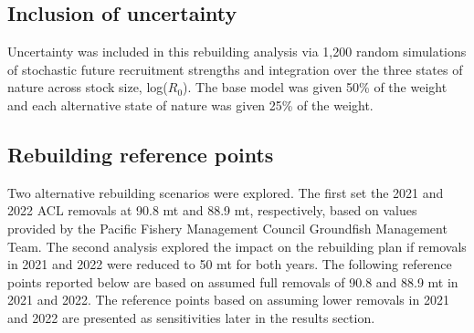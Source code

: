 \documentclass[11pt,
  english,
  a4paper,
]{article}
\begin{document}
\hypertarget{inclusion-of-uncertainty}{%
\subsection{Inclusion of uncertainty}\label{inclusion-of-uncertainty}}

\leavevmode\tagmcend\tagstructend


Uncertainty was included in this rebuilding analysis via 1,200 random simulations of stochastic future recruitment strengths and integration over the three states of nature across stock size, log({\(R_0\)\leavevmode\tagmcend\tagstructend}). The base model was given 50\% of the weight and each alternative state of nature was given 25\% of the weight.

\leavevmode\tagmcend\tagstructend\par


\hypertarget{rebuilding-reference-points}{%
\subsection{Rebuilding reference points}\label{rebuilding-reference-points}}

\leavevmode\tagmcend\tagstructend


Two alternative rebuilding scenarios were explored. The first set the 2021 and 2022 ACL removals at 90.8 mt and 88.9 mt, respectively, based on values provided by the Pacific Fishery Management Council Groundfish Management Team. The second analysis explored the impact on the rebuilding plan if removals in 2021 and 2022 were reduced to 50 mt for both years. The following reference points reported below are based on assumed full removals of 90.8 and 88.9 mt in 2021 and 2022. The reference points based on assuming lower removals in 2021 and 2022 are presented as sensitivities later in the results section.

\leavevmode\tagmcend\tagstructend\par

\end{document}
